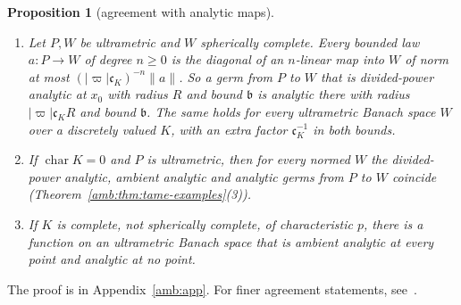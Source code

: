 \documentclass[11pt]{amsart}
\newtheorem{proposition}[theorem]{Proposition}
\theoremstyle{definition}
\theoremstyle{remark}
\numberwithin{equation}{section}
\newcommand{\abs}[1]{\lvert #1\rvert}
\newcommand{\norm}[1]{\lVert #1\rVert}
\theoremstyle{plain}
\theoremstyle{definition}
\theoremstyle{plain}
\begin{document}
\begin{proposition}[agreement with analytic maps]\label{amb:prop:agreement}
\begin{enumerate}
\item Let $P,W$ be ultrametric and $W$ spherically complete. Every bounded law $a\colon P\to W$ of degree $n\ge0$ is the diagonal of an $n$-linear map into $W$ of norm at most $(\abs\varpi\mathfrak c_K)^{-n}\norm a$. So a germ from $P$ to $W$ that is divided-power analytic at $x_0$ with radius $R$ and bound $\mathfrak b$ is analytic there with radius $\abs\varpi\mathfrak c_KR$ and bound $\mathfrak b$. The same holds for every ultrametric Banach space $W$ over a discretely valued $K$, with an extra factor $\mathfrak c_K^{-1}$ in both bounds.
\item If $\operatorname{char}K=0$ and $P$ is ultrametric, then for every normed $W$ the divided-power analytic, ambient analytic and analytic germs from $P$ to $W$ coincide (Theorem~\ref{amb:thm:tame-examples}(3)).
\item If $K$ is complete, not spherically complete, of characteristic $p$, there is a function on an ultrametric Banach space that is ambient analytic at every point and analytic at no point.
\end{enumerate}
\end{proposition}
The proof is in Appendix~\ref{amb:app}. For finer agreement statements, see~\cite{II}.
\end{document}

